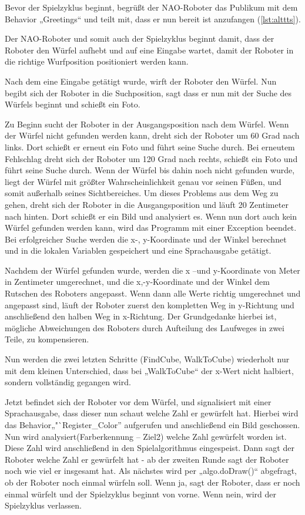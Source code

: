     Bevor der Spielzyklus beginnt, begrüßt der NAO-Roboter das Publikum mit
    dem Behavior „Greetings“ und teilt mit, dass er nun bereit ist
    anzufangen (\autoref{lst:alttts}).

    Der NAO-Roboter und somit auch der Spielzyklus beginnt damit, dass der
    Roboter den Würfel aufhebt und auf eine Eingabe wartet, damit der
    Roboter in die richtige Wurfposition positioniert werden kann.

    Nach dem eine Eingabe getätigt wurde, wirft der Roboter den Würfel.
    Nun begibt sich der Roboter in die Suchposition, sagt dass
    er nun mit der Suche des Würfels beginnt und schießt ein Foto.

    Zu Beginn sucht der Roboter in der Ausgangsposition nach dem Würfel.
    Wenn der Würfel nicht gefunden werden kann, dreht sich der Roboter um
    60 Grad nach links.
    Dort schießt er erneut ein Foto und führt seine Suche durch.
    Bei erneutem Fehlschlag dreht sich der Roboter um 120 Grad nach rechts,
    schießt ein Foto und führt seine Suche durch.
    Wenn der Würfel bis dahin noch nicht gefunden wurde, liegt der Würfel
    mit größter Wahrscheinlichkeit genau vor seinen Füßen, und somit
    außerhalb seines Sichtbereiches.
    Um dieses Problems aus dem Weg zu gehen, dreht sich der Roboter in die
    Ausgangsposition und läuft 20 Zentimeter nach hinten.
    Dort schießt er ein Bild und analysiert es.
    Wenn nun dort auch kein Würfel gefunden werden kann, wird das Programm
    mit einer Exception beendet.
    Bei erfolgreicher Suche werden die x-, y-Koordinate und der Winkel
    berechnet und in die lokalen Variablen gespeichert und eine
    Sprachausgabe getätigt.

    Nachdem der Würfel gefunden wurde, werden die x –und y-Koordinate von
    Meter in Zentimeter umgerechnet, und die x,-y-Koordinate und der Winkel
    dem Rutschen des Roboters angepasst.
    Wenn dann alle Werte richtig umgerechnet und angepasst sind, läuft der
    Roboter zuerst den kompletten Weg in y-Richtung und anschließend den
    halben Weg in x-Richtung.
    Der Grundgedanke hierbei ist, mögliche Abweichungen des Roboters durch
    Aufteilung des Laufweges in zwei Teile, zu kompensieren.

    Nun werden die zwei letzten Schritte (FindCube, WalkToCube) wiederholt
    nur mit dem kleinen Unterschied, dass bei „WalkToCube“ der x-Wert nicht
    halbiert, sondern vollständig gegangen wird.

    Jetzt befindet sich der Roboter vor dem Würfel, und signalisiert mit
    einer Sprachausgabe, dass dieser nun schaut welche Zahl er gewürfelt
    hat.
    Hierbei wird das Behavior„"`Register\_Color'' aufgerufen und
    anschließend ein Bild geschossen.
    Nun wird analysiert(Farberkennung – Ziel2) welche Zahl gewürfelt worden
    ist.
    Diese Zahl wird anschließend in den Spielalgorithmus eingespeist.
    Dann sagt der Roboter welche Zahl er gewürfelt hat - ab der zweiten
    Runde sagt der Roboter noch wie viel er insgesamt hat.
    Als nächstes wird per „algo.doDraw()“ abgefragt, ob der Roboter noch
    einmal würfeln soll.
    Wenn ja, sagt der Roboter, dass er noch einmal würfelt und der
    Spielzyklus beginnt von vorne.
    Wenn nein, wird der Spielzyklus verlassen.

